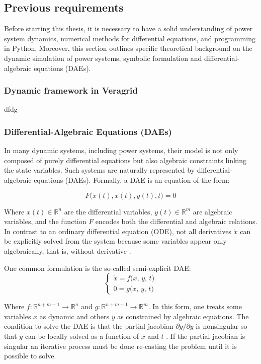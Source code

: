 \subsection{Previous requirements}

Before starting this thesis, it is necessary to have a solid understanding of power system dynamics, numerical methods for differential equations,
and programming in Python. Moreover, this section outlines specific theoretical background on the dynamic simulation of power systems, symbolic formulation and
differential-algebraic equations (DAEs). 

\subsubsection{Dynamic framework in Veragrid}

dfdg
\subsubsection{Differential-Algebraic Equations (DAEs)}

In many dynamic systems, including power systems, their model is not only composed of purely differential equations but also algebraic constraints linking the state
variables. Such systems are naturally represented by differential-algebraic equations (DAEs). Formally, a DAE is an equation of the form: 

\begin{equation}
  F\bigl(\dot{x}(t), x(t), y(t), t\bigr) = 0
\end{equation}


Where $x(t)\in \mathbb{R}^n$ are the differential variables, $y(t)\in \mathbb{R}^m$ are algebraic variables, and the function
 $F$ encodes both the differential and algebraic relations. 
In contrast to an ordinary differential equation (ODE), not all derivatives $\dot{x}$ can be explicitly solved from the system because some variables appear only 
algebraically, that is, without derivative \cite{CasellaDAE}.

One common formulation is the so-called semi-explicit DAE:  
\begin{equation}
\begin{cases}
\dot x = f\bigl(x,\,y,\,t\bigr) \\
0 = g\bigl(x,\,y,\,t\bigr)
\end{cases}
\end{equation} 

Where $f\colon \mathbb{R}^{n+m+1} \to \mathbb{R}^n$ and $g\colon \mathbb{R}^{n+m+1} \to \mathbb{R}^m$. In this form, one treats some variables $x$ as dynamic and others $y$
as constrained by algebraic equations. The condition to solve the DAE is that the partial jacobian $\partial g / \partial y$ is nonsingular so that $y$ can be locally solved as
a function of $x$ and $t$ \cite{CasellaDAE}. If the partial jacobian is singular an iterative process must be done re-casting the problem until it is possible to solve.  

